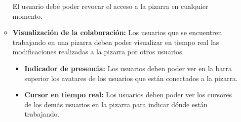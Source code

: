\documentclass[a4paper, oneside, final]{scrartcl}
\begin{document}
\begin{enumerate}
\begin{itemize}
    El usuario debe poder revocar el acceso a la pizarra en cualquier momento.

  \item \textbf{Visualización de la colaboración:} Los usuarios que se encuentren trabajando en una pizarra deben poder visualizar en tiempo real las modificaciones realizadas a la pizarra por otros usuarios.

    \begin{itemize}
    \item \textbf{Indicador de presencia:} Los usuarios deben poder ver en la barra superior los avatares de los usuarios que están conectados a la pizarra.
    \item \textbf{Cursor en tiempo real:} Los usuarios deben poder ver los cursores de los demás usuarios en la pizarra para indicar dónde están trabajando.
    \end{itemize}
  \end{itemize}



\end{enumerate}
\end{document}
